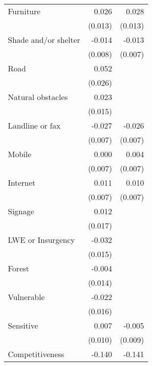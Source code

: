 {\begin{tabular}{l*{2}{D{.}{.}{-1}}}
\addlinespace
Furniture       &    0.026\sym{*}  &    0.028\sym{*}  \\
                &  (0.013)         &  (0.013)         \\
\addlinespace
Shade and/or shelter&   -0.014         &   -0.013         \\
                &  (0.008)         &  (0.007)         \\
\addlinespace
Road            &    0.052\sym{*}  &                  \\
                &  (0.026)         &                  \\
\addlinespace
Natural obstacles&    0.023         &                  \\
                &  (0.015)         &                  \\
\addlinespace
Landline or fax &   -0.027\sym{***}&   -0.026\sym{***}\\
                &  (0.007)         &  (0.007)         \\
\addlinespace
Mobile          &    0.000         &    0.004         \\
                &  (0.007)         &  (0.007)         \\
\addlinespace
Internet        &    0.011         &    0.010         \\
                &  (0.007)         &  (0.007)         \\
\addlinespace
Signage         &    0.012         &                  \\
                &  (0.017)         &                  \\
\addlinespace
LWE or Insurgency&   -0.032\sym{*}  &                  \\
                &  (0.015)         &                  \\
\addlinespace
Forest          &   -0.004         &                  \\
                &  (0.014)         &                  \\
\addlinespace
Vulnerable      &   -0.022         &                  \\
                &  (0.016)         &                  \\
\addlinespace
Sensitive       &    0.007         &   -0.005         \\
                &  (0.010)         &  (0.009)         \\
\addlinespace
Competitiveness &   -0.140\sym{***}&   -0.141\sym{***}\\

\end{tabular}}
